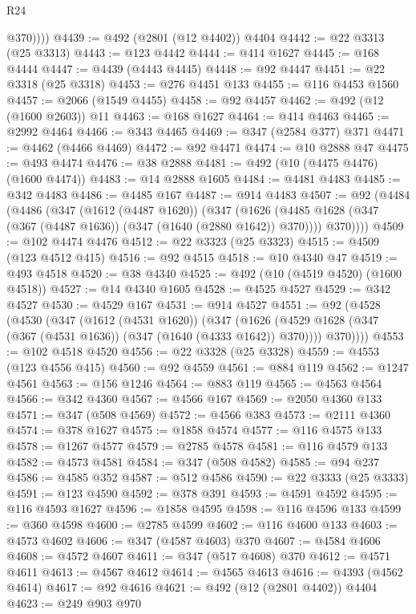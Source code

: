 \begin{lexlean}{R24}
\begin{coremodule}
            @370))))
@4439 := @492 (@2801 (@12 @4402)) @4404
@4442 := @22 @3313 (@25 @3313)
@4443 := @123 @4442
@4444 := @414 @1627
@4445 := @168 @4444
@4447 := @4439 (@4443 @4445)
@4448 := @92 @4447
@4451 := @22 @3318 (@25 @3318)
@4453 := @276 @4451 @133
@4455 := @116 @4453 @1560
@4457 := @2066 (@1549 @4455)
@4458 := @92 @4457
@4462 := @492 (@12 (@1600 @2603)) @11
@4463 := @168 @1627
@4464 := @414 @4463
@4465 := @2992 @4464
@4466 := @343 @4465
@4469 := @347 (@2584 @377) @371
@4471 := @4462 (@4466 @4469)
@4472 := @92 @4471
@4474 := @10 @2888 @47
@4475 := @493 @4474
@4476 := @38 @2888
@4481 := @492 (@10 (@4475 @4476) (@1600 @4474))
@4483 := @14 @2888 @1605
@4484 := @4481 @4483
@4485 := @342 @4483
@4486 := @4485 @167
@4487 := @914 @4483
@4507 := @92
    (@4484
      (@4486
        (@347
          (@1612 (@4487 @1620))
          (@347
            (@1626 (@4485 @1628 (@347 (@367 (@4487 @1636)) (@347 (@1640 (@2880 @1642)) @370))))
            @370))))
@4509 := @102 @4474 @4476
@4512 := @22 @3323 (@25 @3323)
@4515 := @4509 (@123 @4512 @415)
@4516 := @92 @4515
@4518 := @10 @4340 @47
@4519 := @493 @4518
@4520 := @38 @4340
@4525 := @492 (@10 (@4519 @4520) (@1600 @4518))
@4527 := @14 @4340 @1605
@4528 := @4525 @4527
@4529 := @342 @4527
@4530 := @4529 @167
@4531 := @914 @4527
@4551 := @92
    (@4528
      (@4530
        (@347
          (@1612 (@4531 @1620))
          (@347
            (@1626 (@4529 @1628 (@347 (@367 (@4531 @1636)) (@347 (@1640 (@4333 @1642)) @370))))
            @370))))
@4553 := @102 @4518 @4520
@4556 := @22 @3328 (@25 @3328)
@4559 := @4553 (@123 @4556 @415)
@4560 := @92 @4559
@4561 := @884 @119
@4562 := @1247 @4561
@4563 := @156 @1246
@4564 := @883 @119
@4565 := @4563 @4564
@4566 := @342 @4360
@4567 := @4566 @167
@4569 := @2050 @4360 @133
@4571 := @347 (@508 @4569)
@4572 := @4566 @383
@4573 := @2111 @4360
@4574 := @378 @1627
@4575 := @1858 @4574
@4577 := @116 @4575 @133
@4578 := @1267 @4577
@4579 := @2785 @4578
@4581 := @116 @4579 @133
@4582 := @4573 @4581
@4584 := @347 (@508 @4582)
@4585 := @94 @237
@4586 := @4585 @352
@4587 := @512 @4586
@4590 := @22 @3333 (@25 @3333)
@4591 := @123 @4590
@4592 := @378 @391
@4593 := @4591 @4592
@4595 := @116 @4593 @1627
@4596 := @1858 @4595
@4598 := @116 @4596 @133
@4599 := @360 @4598
@4600 := @2785 @4599
@4602 := @116 @4600 @133
@4603 := @4573 @4602
@4606 := @347 (@4587 @4603) @370
@4607 := @4584 @4606
@4608 := @4572 @4607
@4611 := @347 (@517 @4608) @370
@4612 := @4571 @4611
@4613 := @4567 @4612
@4614 := @4565 @4613
@4616 := @4393 (@4562 @4614)
@4617 := @92 @4616
@4621 := @492 (@12 (@2801 @4402)) @4404
@4623 := @249 @903 @970

\end{coremodule}
\end{lexlean}
